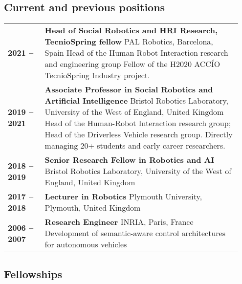 \subsection{Current and previous positions}

\begin{tabular}{p{0.15\linewidth}p{0.8\linewidth}}
    \bf 2021 -- & {\bf Head of Social Robotics and HRI Research, TecnioSpring fellow}
    \newline PAL Robotics, Barcelona, Spain 
    \newline \small Head of the Human-Robot Interaction research and engineering
    group
    \newline \small Fellow of the H2020 ACCÍO TecnioSpring Industry project.\\
    \bf 2019 -- 2021 & {\bf Associate Professor in Social Robotics and Artificial
    Intelligence}
    \newline Bristol Robotics Laboratory, University of the West of England,
    United Kingdom 
    \newline \small Head of the Human-Robot Interaction research group; Head of the Driverless Vehicle research group.
Directly managing 20+ students and early career researchers. \\
    \bf 2018 -- 2019 & {\bf Senior Research Fellow in Robotics and AI} \newline Bristol Robotics Laboratory, University of the West of England, United Kingdom \\
    \bf 2017 -- 2018 & {\bf Lecturer in Robotics} \newline Plymouth University, Plymouth, United Kingdom \\
    \bf 2006 -- 2007 & {\bf Research Engineer} \newline INRIA, Paris, France
    \newline \small Development of semantic-aware control architectures for
    autonomous vehicles \\
\end{tabular}


\subsection{Fellowships}

